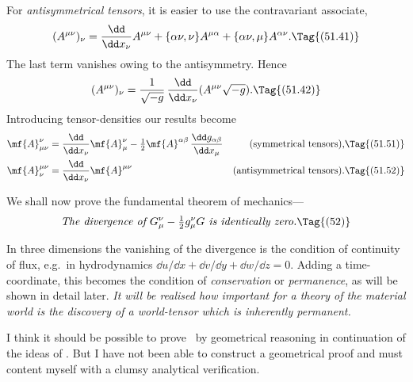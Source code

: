 \documentclass[12pt]{book}
\begin{document}
For \emph{antisymmetrical tensors}, it is easier to use the contravariant associate,
\[
(A^{\mu\nu})_{\nu}
= \frac{\dd}{\dd x_{\nu}} A^{\mu\nu} + \{\alpha\nu,\nu\} A^{\mu\alpha} + \{\alpha\nu, \mu\} A^{\alpha\nu}.
\Tag{(51.41)}
\]
The last term vanishes owing to the antisymmetry. Hence
\[
(A^{\mu\nu})_{\nu}
= \frac{1}{\sqrt{-g}}\, \frac{\dd}{\dd x_{\nu}} (A^{\mu\nu} \sqrt{-g}).
\Tag{(51.42)}
\]
Introducing tensor\hyp{}densities our results become
\begin{align*}
  \mf{A}_{\mu\nu}^{\nu}
  &= \frac{\dd}{\dd x_{\nu}} \mf{A}_{\mu}^{\nu}
  - \tfrac{1}{2} \mf{A}^{\alpha\beta}\, \frac{\dd g_{\alpha\beta}}{\dd x_{\mu}}
  & \text{(symmetrical tensors),}&
  \Tag{(51.51)} \\
  \mf{A}_{\nu}^{\mu\nu}
  &= \frac{\dd}{\dd x_{\nu}} \mf{A}^{\mu\nu}
  & \text{(antisymmetrical tensors).} &
  \Tag{(51.52)}
\end{align*}

%

We shall now prove the fundamental theorem of me\-cha\-nics---
%
\[
\text{\emph{The divergence of $G_{\mu}^{\nu} - \tfrac{1}{2}g_{\mu}^{\nu} G$ is identically zero.}}
\index{Divergence!energy@of energy-tensor}%
\Tag{(52)}
\]

In three dimensions the vanishing of the divergence is the condition of
continuity of flux, e.g.\ in hydrodynamics $\dd u/\dd x + \dd v/\dd y + \dd w/\dd z = 0$. Adding a
time-coordinate, this becomes the condition of \emph{conservation} or \emph{permanence}, as
%
will be shown in detail later. \emph{It will be realised how important for a theory
of the material world is the discovery of a world-tensor which is inherently
permanent.}

I think it should be possible to prove~ by geometrical reasoning in
continuation of the ideas of . But I have not been able to construct a
geometrical proof and must content myself with a clumsy analytical verification.
\end{document}
